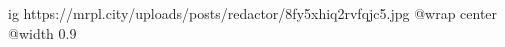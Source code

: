  
 
 
 
 

\ifcmt
  ig https://mrpl.city/uploads/posts/redactor/8fy5xhiq2rvfqjc5.jpg
  @wrap center
  @width 0.9
\fi
